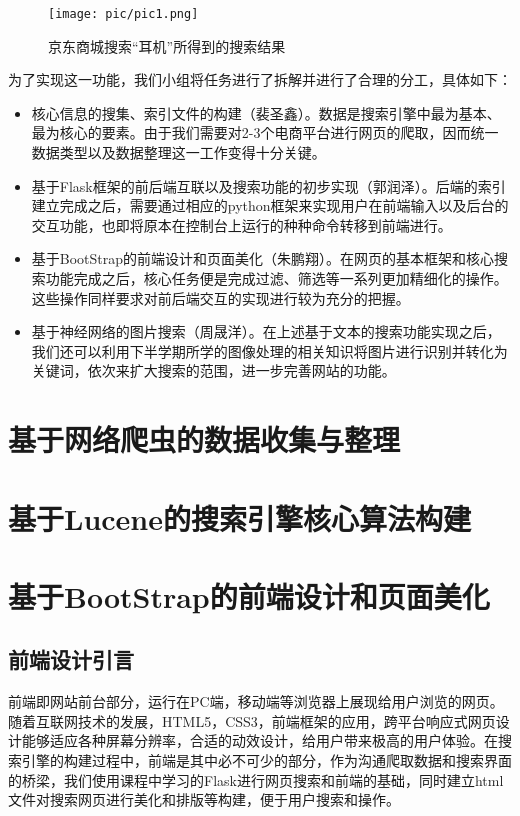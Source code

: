 \documentclass[a4paper,12pt]{article}
\begin{document}
    \begin{figure}[H]
        \centering
        \texttt{[image: pic/pic1.png]}
        \caption{京东商城搜索“耳机”所得到的搜索结果}
        \label{fig:1}
    \end{figure}

    为了实现这一功能，我们小组将任务进行了拆解并进行了合理的分工，具体如下：
    \begin{itemize}
        \item 核心信息的搜集、索引文件的构建（裴圣鑫）。数据是搜索引擎中最为基本、最为核心的要素。由于我们需要对2-3个电商平台进行网页的爬取，因而统一数据类型以及数据整理这一工作变得十分关键。
        \item 基于Flask框架的前后端互联以及搜索功能的初步实现（郭润泽）。后端的索引建立完成之后，需要通过相应的python框架来实现用户在前端输入以及后台的交互功能，也即将原本在控制台上运行的种种命令转移到前端进行。
        \item 基于BootStrap的前端设计和页面美化（朱鹏翔）。在网页的基本框架和核心搜索功能完成之后，核心任务便是完成过滤、筛选等一系列更加精细化的操作。这些操作同样要求对前后端交互的实现进行较为充分的把握。
        \item 基于神经网络的图片搜索（周晟洋）。在上述基于文本的搜索功能实现之后，我们还可以利用下半学期所学的图像处理的相关知识将图片进行识别并转化为关键词，依次来扩大搜索的范围，进一步完善网站的功能。
    \end{itemize}

    \section{基于网络爬虫的数据收集与整理}

    \section{基于Lucene的搜索引擎核心算法构建}


    \section{基于BootStrap的前端设计和页面美化}

    \subsection{前端设计引言}

    前端即网站前台部分，运行在PC端，移动端等浏览器上展现给用户浏览的网页。随着互联网技术的发展，HTML5，CSS3，前端框架的应用，跨平台响应式网页设计能够适应各种屏幕分辨率，合适的动效设计，给用户带来极高的用户体验。在搜索引擎的构建过程中，前端是其中必不可少的部分，作为沟通爬取数据和搜索界面的桥梁，我们使用课程中学习的Flask进行网页搜索和前端的基础，同时建立html文件对搜索网页进行美化和排版等构建，便于用户搜索和操作。
\end{document}
